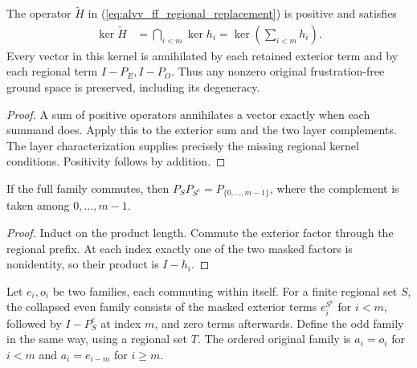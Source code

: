 \begin{lemma}
    \label{thm:alvv_ff_regional_kernel}
    \leanok
    The operator $\widetilde H$ in
    (\ref{eq:alvv_ff_regional_replacement}) is positive and satisfies
    \begin{align}
        \ker\widetilde H & =\bigcap_{i<m}\ker h_i
        =\ker\left(\sum_{i<m}h_i\right).
        \label{eq:alvv_ff_regional_kernel}
    \end{align}
    Every vector in this kernel is annihilated by each retained exterior
    term and by each regional term $I-P_E,I-P_O$.
    Thus any nonzero original frustration-free ground space is
    preserved, including its degeneracy.
\end{lemma}
\begin{proof}\leanok
    A sum of positive operators annihilates a vector exactly when each
    summand does. Apply this to the exterior sum and the two layer
    complements. The layer characterization supplies precisely the
    missing regional kernel conditions. Positivity follows by addition.
\end{proof}

\begin{lemma}
    \label{lem:alvv_ff_layer_split}
    \leanok
    If the full family commutes, then $P_SP_{S^c}=P_{\{0,\ldots,m-1\}}$,
    where the complement is taken among $0,\ldots,m-1$.
\end{lemma}
\begin{proof}\leanok
    Induct on the product length. Commute the exterior factor through
    the regional prefix. At each index exactly one of the two masked
    factors is nonidentity, so their product is $I-h_i$.
\end{proof}

\begin{definition}
    \label{def:alvv_ff_collapsed_layers}
    \leanok
    Let $e_i,o_i$ be two families, each commuting within itself.
    For a finite regional set $S$, the collapsed even family consists
    of the masked exterior terms $e_i^{S^c}$ for $i<m$, followed by
    $I-P_S^e$ at index $m$, and zero terms afterwards. Define the odd
    family in the same way, using a regional set $T$.
    The ordered original family is
    $a_i=o_i$ for $i<m$ and $a_i=e_{i-m}$ for $i\ge m$.
\end{definition}

